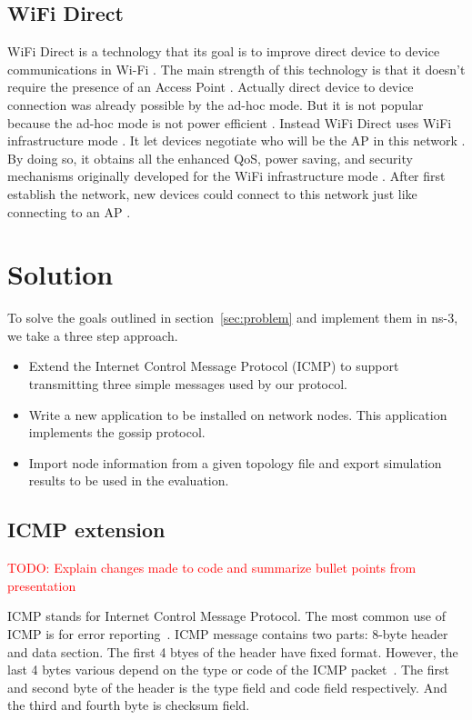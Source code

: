 \documentclass[12pt,journal]{IEEEtran}
\begin{document}
\subsection{WiFi Direct}
WiFi Direct is a technology that its goal is to improve direct device to device communications in Wi-Fi \cite{Mur}. The main strength of this technology is that it doesn’t require the presence of an Access Point \cite{Mur}. Actually direct device to device connection was already possible by the ad-hoc mode. But it is not popular because the ad-hoc mode is not power efficient \cite{Mur}. Instead WiFi Direct uses WiFi infrastructure mode \cite{Mur}. It let devices negotiate who will be the AP in this network \cite{Mur}. By doing so, it obtains all the enhanced QoS, power saving, and security mechanisms originally developed for the WiFi infrastructure mode \cite{Mur}. After first establish the network, new devices could connect to this network just like connecting to an AP \cite{Mur}.

\section{Solution}
To solve the goals outlined in section~\ref{sec:problem} and implement them in ns-3, we take a three step approach.

\begin{itemize}
 \item Extend the Internet Control Message Protocol (ICMP) to support transmitting three simple messages used by our protocol.
 \item Write a new application to be installed on network nodes. This application implements the gossip protocol.
 \item Import node information from a given topology file and export simulation results to be used in the evaluation.
\end{itemize}

\subsection{ICMP extension}
\textcolor{red}{TODO: Explain changes made to code and summarize bullet points from presentation}

ICMP stands for Internet Control Message Protocol. The most common use of ICMP is for error reporting~\cite{james}. ICMP message contains two parts: 8-byte header and data section. The first 4 btyes of the header have fixed format. However, the last 4 bytes various depend on the type or code of the ICMP packet~\cite{forouzan}. The first and second byte of the header is the type field and code field respectively. And the third and fourth byte is checksum field.
 
\end{document}
